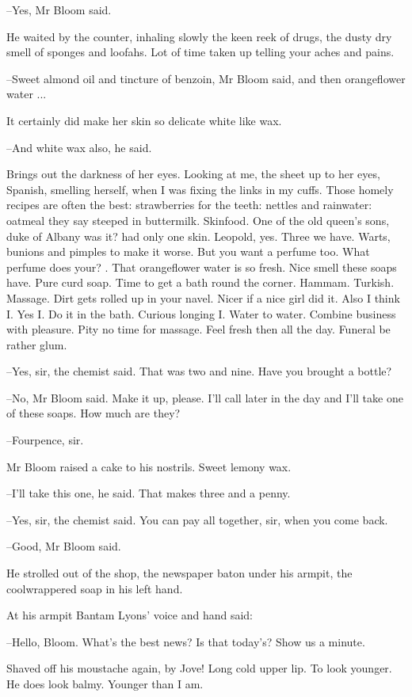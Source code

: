 --Yes,
Mr Bloom said.

He waited by the counter,
inhaling slowly the keen reek of drugs,
the dusty dry smell of sponges and loofahs.
Lot of time taken up telling your
aches and pains.

--Sweet almond oil and tincture of benzoin,
Mr Bloom said,
and then orangeflower water ...

It certainly did make her skin so delicate white like wax.

--And white wax also,
he said.

Brings out the darkness of her eyes.
Looking at me,
the sheet up to her eyes,
Spanish,
smelling herself,
when I was fixing the links in my cuffs.
Those homely recipes are often the best:
strawberries for the teeth:
nettles and rainwater:
oatmeal they say steeped in buttermilk.
Skinfood.
One of the old queen's sons,
duke of Albany was it?
had only one skin.
Leopold, yes.
Three we have.
Warts, bunions and pimples to make it worse.
But you want a perfume too.
What perfume does your?
.
That orangeflower water is so fresh.
Nice smell these soaps have.
Pure curd soap.
Time to get a bath round the corner.
Hammam.
Turkish.
Massage.
Dirt gets rolled up in your navel.
Nicer if a nice girl did it.
Also I think I.
Yes I.
Do it in the bath.
Curious longing I.
Water to water.
Combine business with pleasure.
Pity no time for massage.
Feel fresh then all the day.
Funeral be rather glum.

--Yes, sir,
the chemist said.
That was two and nine.
Have you brought a bottle?

--No,
Mr Bloom said.
Make it up, please.
I'll call later in the day
and I'll take one of these soaps.
How much are they?

--Fourpence, sir.

Mr Bloom raised a cake to his nostrils.
Sweet lemony wax.

--I'll take this one,
he said.
That makes three and a penny.

--Yes, sir,
the chemist said.
You can pay all together, sir, when you come back.

--Good,
Mr Bloom said.

He strolled out of the shop,
the newspaper baton under his armpit,
the coolwrappered soap in his left hand.

At his armpit
Bantam Lyons' voice and hand said:

--Hello, Bloom.
What's the best news?
Is that today's?
Show us a minute.

Shaved off his moustache again, by Jove!
Long cold upper lip.
To look younger.
He does look balmy.
Younger than I am.

